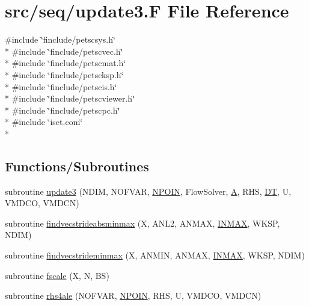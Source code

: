 \hypertarget{seq_2update3_8_f}{\section{src/seq/update3.F File Reference}
\label{seq_2update3_8_f}
}
{\ttfamily \#include \char`\"{}finclude/petscsys.\-h\char`\"{}}\\*
{\ttfamily \#include \char`\"{}finclude/petscvec.\-h\char`\"{}}\\*
{\ttfamily \#include \char`\"{}finclude/petscmat.\-h\char`\"{}}\\*
{\ttfamily \#include \char`\"{}finclude/petscksp.\-h\char`\"{}}\\*
{\ttfamily \#include \char`\"{}finclude/petscis.\-h\char`\"{}}\\*
{\ttfamily \#include \char`\"{}finclude/petscviewer.\-h\char`\"{}}\\*
{\ttfamily \#include \char`\"{}finclude/petscpc.\-h\char`\"{}}\\*
{\ttfamily \#include \char`\"{}iset.\-com\char`\"{}}\\*
\subsection*{Functions/\-Subroutines}
\begin{DoxyCompactItemize}
\item 
subroutine \hyperlink{seq_2update3_8_f_a1fa95004e6fe4f929e617b058b45c302}{update3} (N\-D\-I\-M, N\-O\-F\-V\-A\-R, \hyperlink{mesh_8com_ae28c1572321efcd8715b974d87d20c58}{N\-P\-O\-I\-N}, Flow\-Solver, \hyperlink{ibc2_8com_ad2108d58343608772fff791c23da58f5}{A}, R\-H\-S, \hyperlink{myts_8com_a41549d5ede5e2b840495daf35608da41}{D\-T}, U, V\-M\-D\-C\-O, V\-M\-D\-C\-N)
\item 
subroutine \hyperlink{seq_2update3_8_f_a77d03590b7a1098381b9debf2d2c705b}{findvecstrideabsminmax} (X, A\-N\-L2, A\-N\-M\-A\-X, \hyperlink{conv_8com_a281aba02624028804313692bfd933597}{I\-N\-M\-A\-X}, W\-K\-S\-P, N\-D\-I\-M)
\item 
subroutine \hyperlink{seq_2update3_8_f_a440340b0ed62b09e6285c68d04e8af50}{findvecstrideminmax} (X, A\-N\-M\-I\-N, A\-N\-M\-A\-X, \hyperlink{conv_8com_a281aba02624028804313692bfd933597}{I\-N\-M\-A\-X}, W\-K\-S\-P, N\-D\-I\-M)
\item 
subroutine \hyperlink{seq_2update3_8_f_aa02299ce918cf0f3224e8a1c680bb75e}{fscale} (X, N, B\-S)
\item 
subroutine \hyperlink{seq_2update3_8_f_a0de155f40ac3253e57fe27541644d7a3}{rhs4ale} (N\-O\-F\-V\-A\-R, \hyperlink{mesh_8com_ae28c1572321efcd8715b974d87d20c58}{N\-P\-O\-I\-N}, R\-H\-S, U, V\-M\-D\-C\-O, V\-M\-D\-C\-N)
\end{DoxyCompactItemize}


